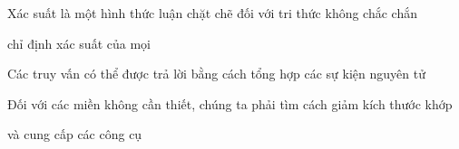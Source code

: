 \documentclass{article}
\begin{document}
\begin{huge}

Xác suất là một hình thức luận chặt chẽ đối với tri thức không chắc chắn

 chỉ định xác suất của mọi 

Các truy vấn có thể được trả lời bằng cách tổng hợp các sự kiện nguyên tử

Đối với các miền không cần thiết, chúng ta phải tìm cách giảm kích thước khớp

 và  cung cấp các công cụ










\end{huge} 
\end{document}
